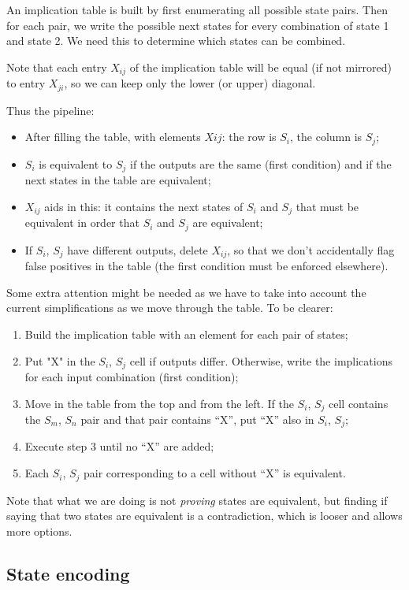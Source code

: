 \documentclass[a4paper,11pt]{article}
\begin{document}
An implication table is built by first enumerating all possible state pairs.
Then for each pair, we write the possible next states for every combination of state 1 and state 2.
We need this to determine which states can be combined.

Note that each entry $X_{ij}$ of the implication table will be equal (if not mirrored) to entry $X_{ji}$, so we can keep only the lower (or upper) diagonal.

Thus the pipeline:
\begin{itemize}
	\item After filling the table, with elements $X{ij}$: the row is $S_i$, the column is $S_j$;
	\item $S_i$ is equivalent to $S_j$ if the outputs are the same (first condition) and if the next states in the table are equivalent;
	\item $X_{ij}$ aids in this: it contains the next states of $S_i$ and $S_j$ that must be equivalent in order that $S_i$ and $S_j$ are equivalent;
	\item If $S_i$, $S_j$ have different outputs, delete $X_{ij}$, so that we don't accidentally flag false positives in the table (the first condition must be enforced elsewhere).
\end{itemize}

Some extra attention might be needed as we have to take into account the current simplifications as we move through the table.
To be clearer:
\begin{enumerate}
	\item Build the implication table with an element for each pair of states;
	\item Put "X" in the $S_i$, $S_j$ cell if outputs differ. Otherwise, write the implications for each input combination (first condition);
	\item Move in the table from the top and from the left. If the $S_i$, $S_j$ cell contains the $S_m$, $S_n$ pair and that pair contains “X”, put “X” also in $S_i$, $S_j$;
	\item Execute step 3 until no “X” are added;
	\item Each $S_i$, $S_j$ pair corresponding to a cell without “X” is equivalent.
\end{enumerate}

Note that what we are doing is not \textit{proving} states are equivalent, but finding if saying that two states are equivalent is a contradiction, which is looser and allows more options.

\subsection{State encoding}
\end{document}
